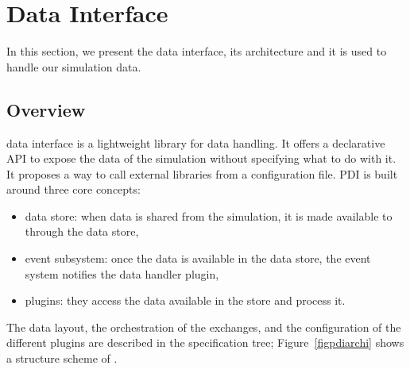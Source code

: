 \section{\pdi Data Interface}\label{sec:pdi}
In this section, we present the \pdi data interface, its architecture and it is used to handle our simulation data.

\subsection{Overview}\label{sec:pdioverview}

\pdi\cite{roussel:hal-01587075} data interface is a lightweight library for data handling.
It offers a declarative API to expose the data of the simulation without specifying what to do with it.
It proposes a way to call external libraries from a configuration file. 
PDI is built around three core concepts: 
\begin{itemize}
    \item data store: when data is shared from the simulation, it is made available to \pdi through the data store,
    \item event subsystem: once the data is available in the data store, the event system notifies the data handler plugin,
    \item plugins: they access the data available in the store and process it.   
\end{itemize}
The data layout, the orchestration of the exchanges, and the configuration of the different plugins are described in the specification tree; Figure~\ref {figpdiarchi} shows a structure scheme of \pdi\cite{noauthor_pdi_nodate}.  


